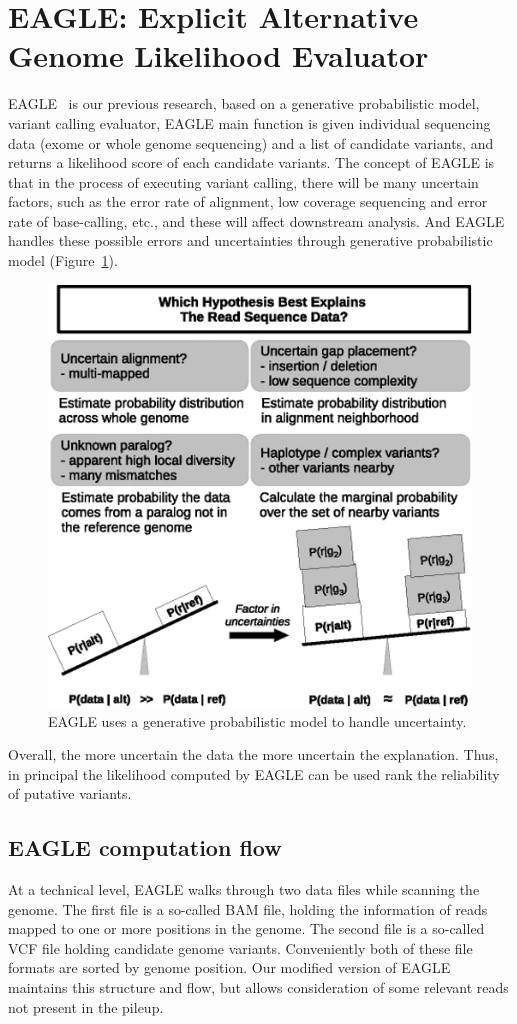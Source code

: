 \section{EAGLE: Explicit Alternative Genome Likelihood Evaluator}
EAGLE~\cite{kuo2018eagle} is our previous research, based on a generative probabilistic model, variant calling evaluator, EAGLE main function is given individual sequencing data (exome or whole genome sequencing) and a list of candidate variants, and returns a likelihood score of each candidate variants.
The concept of EAGLE is that in the process of executing variant calling, there will be many uncertain factors, such as the error rate of alignment, low coverage sequencing and error rate of base-calling, etc., and these will affect downstream analysis. And EAGLE handles these possible errors and uncertainties through generative probabilistic model  (Figure~\ref{eagle_model}).
\begin{figure}[ht]
\center
\includegraphics[width=0.6\columnwidth]{body/image/eagle_model.png}
\caption[EAGLE model]{EAGLE uses a generative probabilistic model to handle uncertainty.}
\label{eagle_model}
\end{figure}

Overall, the more uncertain the data the more uncertain the explanation.  Thus, in principal the likelihood computed by EAGLE can be used rank the reliability of putative variants.

\subsection{EAGLE computation flow}
At a technical level, EAGLE walks through two data files while scanning the genome.  The first file is a so-called BAM file, holding the information of reads mapped to one or more positions in the genome.  The second file is a so-called VCF file holding candidate genome variants.  Conveniently both of these file formats are sorted by genome position.  Our modified version of EAGLE maintains this structure and flow, but allows consideration of some relevant reads not present in the pileup.


